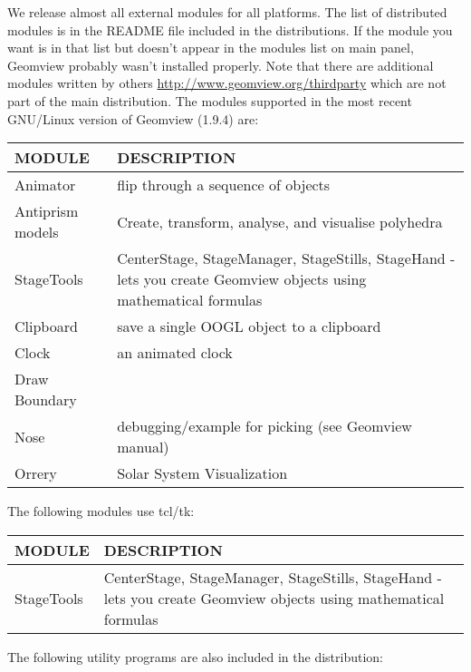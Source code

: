 \documentclass[12pt,a4paper]{article}
\begin{document}
        We release almost all external modules for all platforms. The list of
        distributed modules is in the README file included in the distributions.
        If the module you want is in that list but doesn't appear in the modules
        list on main panel, Geomview probably wasn't installed properly. Note
        that there are additional modules written by others
        \url{http://www.geomview.org/thirdparty} which are not part of the main
        distribution. The modules supported in the most recent GNU/Linux version of
        Geomview (1.9.4) are:\\
        \begin{center}
        \begin{tabular}{|l|p{8cm}|}
        \hline
        MODULE & DESCRIPTION \\ \hline
        Animator & flip through a sequence of objects \\ \hline
        Antiprism models & Create, transform, analyse, and visualise polyhedra\\ \hline
        StageTools & CenterStage, StageManager, StageStills, StageHand - lets you create Geomview objects using mathematical formulas\\ \hline
        Clipboard & save a single OOGL object to a clipboard \\ \hline
        Clock & an animated clock \\ \hline
        Draw Boundary & \\ \hline
        Nose & debugging/example for picking (see Geomview manual)\\ \hline
        Orrery & Solar System Visualization \\ \hline
        \end{tabular}
	\end{center}
        The following modules use tcl/tk:
        \begin{center}
        \begin{tabular}{|l|p{8cm}|}
        \hline
        MODULE & DESCRIPTION \\ \hline
        StageTools & CenterStage, StageManager, StageStills, StageHand - lets you create Geomview objects using mathematical formulas\\ \hline
        \end{tabular}
	\end{center}
        The following utility programs are also included in the distribution:
\end{document}
